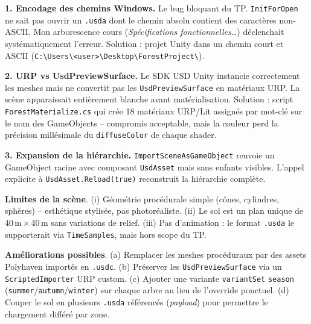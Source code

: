 \documentclass[11pt,a4paper]{article}
\begin{document}
\textbf{1. Encodage des chemins Windows.} Le bug bloquant du TP. \texttt{InitForOpen} ne sait pas ouvrir un \texttt{.usda} dont le chemin absolu contient des caractères non-ASCII. Mon arborescence cours (\emph{Spécifications fonctionnelles\ldots}) déclenchait systématiquement l'erreur. Solution : projet Unity dans un chemin court et ASCII (\texttt{C:\textbackslash Users\textbackslash<user>\textbackslash Desktop\textbackslash ForestProject\textbackslash}).

\textbf{2. URP vs UsdPreviewSurface.} Le SDK USD Unity instancie correctement les meshes mais ne convertit pas les \texttt{UsdPreviewSurface} en matériaux URP. La scène apparaissait entièrement blanche avant matérialisation. Solution : script \texttt{ForestMaterialize.cs} qui crée 18 matériaux URP/Lit assignés par mot-clé sur le nom des GameObjects -- compromis acceptable, mais la couleur perd la précision millésimale du \texttt{diffuseColor} de chaque shader.

\textbf{3. Expansion de la hiérarchie.} \texttt{ImportSceneAsGameObject} renvoie un GameObject racine avec composant \texttt{UsdAsset} mais sans enfants visibles. L'appel explicite à \texttt{UsdAsset.Reload(true)} reconstruit la hiérarchie complète.

\textbf{Limites de la scène}. (i) Géométrie procédurale simple (cônes, cylindres, sphères) -- esthétique stylisée, pas photoréaliste. (ii) Le sol est un plan unique de 40\,m\,$\times$\,40\,m sans variations de relief. (iii) Pas d'animation : le format \texttt{.usda} le supporterait via \texttt{TimeSamples}, mais hors scope du TP.

\textbf{Améliorations possibles}. (a) Remplacer les meshes procéduraux par des assets Polyhaven importés en \texttt{.usdc}. (b) Préserver les \texttt{UsdPreviewSurface} via un \texttt{ScriptedImporter} URP custom. (c) Ajouter une variante \texttt{variantSet} \texttt{season} (\texttt{summer}/\texttt{autumn}/\texttt{winter}) sur chaque arbre au lieu de l'override ponctuel. (d) Couper le sol en plusieurs \texttt{.usda} référencés (\emph{payload}) pour permettre le chargement différé par zone.
\end{document}
